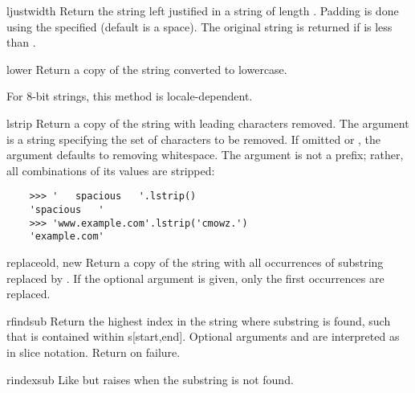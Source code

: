 \begin{methoddesc}[string]{ljust}{width}
Return the string left justified in a string of length .
Padding is done using the specified  (default is a
space).  The original string is returned if
 is less than .
\end{methoddesc}

\begin{methoddesc}[string]{lower}{}
Return a copy of the string converted to lowercase.

For 8-bit strings, this method is locale-dependent.
\end{methoddesc}

\begin{methoddesc}[string]{lstrip}{}
Return a copy of the string with leading characters removed.  The
 argument is a string specifying the set of characters
to be removed.  If omitted or , the  argument
defaults to removing whitespace.  The  argument is not
a prefix; rather, all combinations of its values are stripped:
\begin{verbatim}
    >>> '   spacious   '.lstrip()
    'spacious   '
    >>> 'www.example.com'.lstrip('cmowz.')
    'example.com'
\end{verbatim}
\end{methoddesc}

\begin{methoddesc}[string]{replace}{old, new}
Return a copy of the string with all occurrences of substring
 replaced by .  If the optional argument
 is given, only the first  occurrences are
replaced.
\end{methoddesc}

\begin{methoddesc}[string]{rfind}{sub }
Return the highest index in the string where substring  is
found, such that  is contained within s[start,end].  Optional
arguments  and  are interpreted as in slice
notation.  Return  on failure.
\end{methoddesc}

\begin{methoddesc}[string]{rindex}{sub}
Like  but raises  when the
substring  is not found.
\end{methoddesc}

